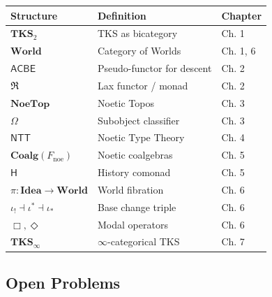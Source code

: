 \begin{center}
\begin{tabular}{|l|l|l|}
\hline
\textbf{Structure} & \textbf{Definition} & \textbf{Chapter} \\
\hline
$\mathbf{TKS}_2$ & TKS as bicategory & Ch. 1 \\
$\mathbf{World}$ & Category of Worlds & Ch. 1, 6 \\
$\mathsf{ACBE}$ & Pseudo-functor for descent & Ch. 2 \\
$\mathfrak{R}$ & Lax functor / monad & Ch. 2 \\
$\mathbf{NoeTop}$ & Noetic Topos & Ch. 3 \\
$\Omega$ & Subobject classifier & Ch. 3 \\
$\mathsf{NTT}$ & Noetic Type Theory & Ch. 4 \\
$\mathbf{Coalg}(F_{\mathrm{noe}})$ & Noetic coalgebras & Ch. 5 \\
$\mathsf{H}$ & History comonad & Ch. 5 \\
$\pi : \mathbf{Idea} \to \mathbf{World}$ & World fibration & Ch. 6 \\
$\iota_! \dashv \iota^* \dashv \iota_*$ & Base change triple & Ch. 6 \\
$\Box, \Diamond$ & Modal operators & Ch. 6 \\
$\mathbf{TKS}_\infty$ & $\infty$-categorical TKS & Ch. 7 \\
\hline
\end{tabular}
\end{center}

\subsection{Open Problems}
\label{subsec:open-problems}

